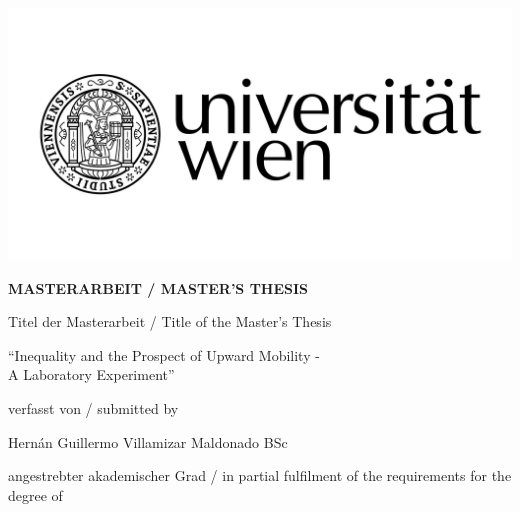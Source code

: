 \begin{titlepage}
\vspace*{-2cm}  %
\begin{flushright}
    \includegraphics[width=0.5\linewidth]{Uni_Logo_2016_SW}
\end{flushright}

\begin{center}  %
    \LARGE{\textbf{{\MakeUppercase{
        MASTERARBEIT / MASTER'S THESIS
    }}}}
    
    \vspace{1cm}
    \small{{  %
        Titel der Masterarbeit / Title of the Master's Thesis
    }}
    
    \vspace{1cm}
    \Large{{  %
        ``Inequality and the Prospect of Upward Mobility -\\
        A Laboratory Experiment''
    }}
    
    \vspace{1cm}
    \small{{  %
        verfasst von / submitted by
    }}
    
    \Large{{  %
        Hern\'an Guillermo Villamizar Maldonado BSc
    }}
    
    \vspace{1cm}
    \small{{
        angestrebter akademischer Grad / in partial fulfilment of the requirements for the degree of  %
    }}


\end{center}
\end{titlepage}
